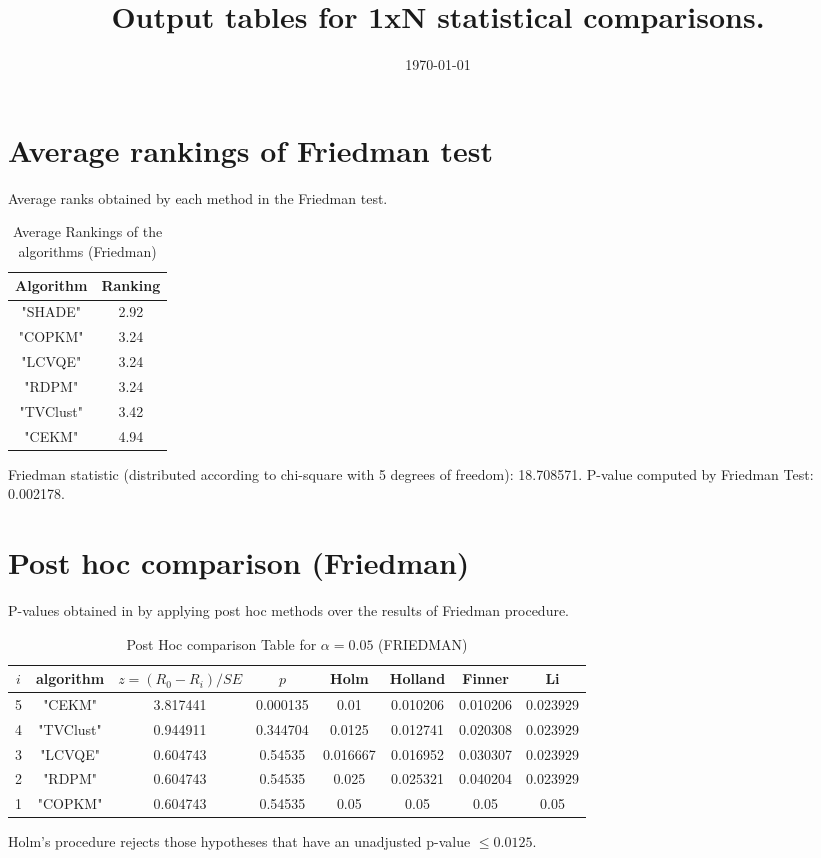 \documentclass[a4paper,10pt]{article}
\title{Output tables for 1xN statistical comparisons.}
\author{}
\date{\today}
\begin{document}
\pagestyle{empty}
\maketitle
\thispagestyle{empty}

\section{Average rankings of Friedman test}


Average ranks obtained by each method in the Friedman test.

\begin{table}[!htp]
\centering
\begin{tabular}{|c|c|}\hline
Algorithm&Ranking\\\hline
"SHADE"&2.92\\"COPKM"&3.24\\"LCVQE"&3.24\\"RDPM"&3.24\\"TVClust"&3.42\\"CEKM"&4.94\\\hline\end{tabular}
\caption{Average Rankings of the algorithms (Friedman)}
\end{table}

Friedman statistic (distributed according to chi-square with 5 degrees of freedom): 18.708571. \newline P-value computed by Friedman Test: 0.002178.\newline


\newpage

\section{Post hoc comparison (Friedman)}


P-values obtained in by applying post hoc methods over the results of Friedman procedure.

\begin{table}[!htp]
\centering\footnotesize
\begin{tabular}{cccccccc}
$i$&algorithm&$z=(R_0 - R_i)/SE$&$p$&Holm &Holland&Finner&Li\\
\hline5&"CEKM"&3.817441&0.000135&0.01&0.010206&0.010206&0.023929\\4&"TVClust"&0.944911&0.344704&0.0125&0.012741&0.020308&0.023929\\3&"LCVQE"&0.604743&0.54535&0.016667&0.016952&0.030307&0.023929\\2&"RDPM"&0.604743&0.54535&0.025&0.025321&0.040204&0.023929\\1&"COPKM"&0.604743&0.54535&0.05&0.05&0.05&0.05\\\hline
\end{tabular}
\caption{Post Hoc comparison Table for $\alpha=0.05$ (FRIEDMAN)}
\end{table}Holm's procedure rejects those hypotheses that have an unadjusted p-value $\le0.0125$.
\end{document}
